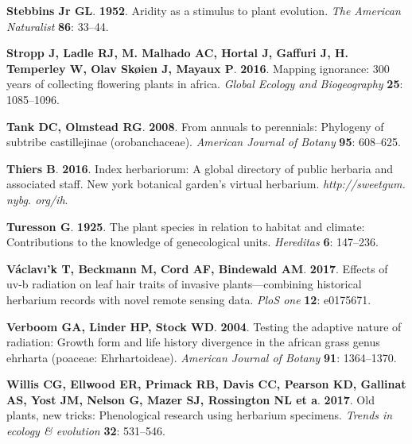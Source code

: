 \documentclass[man,floatsintext]{apa6}
\theoremstyle{definition}
\theoremstyle{definition}
\theoremstyle{definition}
\theoremstyle{remark}
\begin{document}
\leavevmode\hypertarget{ref-stebbins1952aridity}{}%
\textbf{\textnormal{Stebbins Jr GL}}. \textbf{1952}. Aridity as a
stimulus to plant evolution. \emph{The American Naturalist} \textbf{86}:
33--44.

\leavevmode\hypertarget{ref-stropp2016mapping}{}%
\textbf{\textnormal{Stropp J}, \textnormal{Ladle RJ}, \textnormal{M.
Malhado AC}, \textnormal{Hortal J}, \textnormal{Gaffuri J},
\textnormal{H. Temperley W}, \textnormal{Olav Skøien J},
\textnormal{Mayaux P}}. \textbf{2016}. Mapping ignorance: 300 years of
collecting flowering plants in africa. \emph{Global Ecology and
Biogeography} \textbf{25}: 1085--1096.

\leavevmode\hypertarget{ref-tank2008annuals}{}%
\textbf{\textnormal{Tank DC}, \textnormal{Olmstead RG}}. \textbf{2008}.
From annuals to perennials: Phylogeny of subtribe castillejinae
(orobanchaceae). \emph{American Journal of Botany} \textbf{95}:
608--625.

\leavevmode\hypertarget{ref-thiers2016index}{}%
\textbf{\textnormal{Thiers B}}. \textbf{2016}. Index herbariorum: A
global directory of public herbaria and associated staff. New york
botanical garden's virtual herbarium. \emph{http://sweetgum. nybg.
org/ih}.

\leavevmode\hypertarget{ref-turesson1925plant}{}%
\textbf{\textnormal{Turesson G}}. \textbf{1925}. The plant species in
relation to habitat and climate: Contributions to the knowledge of
genecological units. \emph{Hereditas} \textbf{6}: 147--236.

\leavevmode\hypertarget{ref-vaclavik2017effects}{}%
\textbf{\textnormal{Václavı'k T}, \textnormal{Beckmann M},
\textnormal{Cord AF}, \textnormal{Bindewald AM}}. \textbf{2017}. Effects
of uv-b radiation on leaf hair traits of invasive plants---combining
historical herbarium records with novel remote sensing data. \emph{PloS
one} \textbf{12}: e0175671.

\leavevmode\hypertarget{ref-verboom2004testing}{}%
\textbf{\textnormal{Verboom GA}, \textnormal{Linder HP},
\textnormal{Stock WD}}. \textbf{2004}. Testing the adaptive nature of
radiation: Growth form and life history divergence in the african grass
genus ehrharta (poaceae: Ehrhartoideae). \emph{American Journal of
Botany} \textbf{91}: 1364--1370.

\leavevmode\hypertarget{ref-willis2017old}{}%
\textbf{\textnormal{Willis CG}, \textnormal{Ellwood ER},
\textnormal{Primack RB}, \textnormal{Davis CC}, \textnormal{Pearson KD},
\textnormal{Gallinat AS}, \textnormal{Yost JM}, \textnormal{Nelson G},
\textnormal{Mazer SJ}, \textnormal{Rossington NL et a}}. \textbf{2017}.
Old plants, new tricks: Phenological research using herbarium specimens.
\emph{Trends in ecology \& evolution} \textbf{32}: 531--546.
\end{document}
